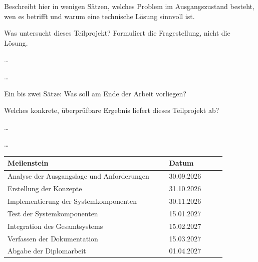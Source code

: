 \abschnittsautor{\alleautoren}


Beschreibt hier in wenigen Sätzen, welches Problem im Ausgangszustand besteht,
wen es betrifft und warum eine technische Lösung sinnvoll ist.


Was untersucht dieses Teilprojekt? Formuliert die Fragestellung, nicht die
Lösung.

\dots

\dots


Ein bis zwei Sätze: Was soll am Ende der Arbeit vorliegen?


Welches konkrete, überprüfbare Ergebnis liefert dieses Teilprojekt ab?

\dots

\dots


\begin{tabular}{@{}p{0.68\linewidth}p{0.24\linewidth}@{}}
    \toprule
    \bfseries Meilenstein & \bfseries Datum \\
    \midrule
    Analyse der Ausgangslage und Anforderungen & 30.09.2026 \\
    Erstellung der Konzepte                    & 31.10.2026 \\
    Implementierung der Systemkomponenten      & 30.11.2026 \\
    Test der Systemkomponenten                 & 15.01.2027 \\
    Integration des Gesamtsystems              & 15.02.2027 \\
    Verfassen der Dokumentation                & 15.03.2027 \\
  Abgabe der Diplomarbeit                    & 01.04.2027 \\
  \bottomrule
\end{tabular}

